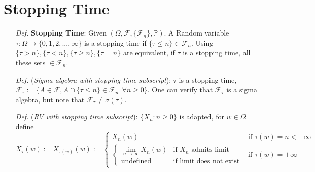 \documentclass[a4paper,12pt,twoside]{book}
\begin{document}
\section{Stopping Time}
\begin{itemize}
	\item[\textit{Def.}] \textbf{Stopping Time}: Given $(\Omega, \mathcal{F}, \{\mathcal{F}_n\}, \mathbb{P})$. A Random variable $\tau: \Omega \to \{0,1,2,..., \infty\}$ is a stopping time if $\{\tau\leq n\}\in \mathcal{F}_n$. Using $\{\tau>n\},\{\tau<n\},\{\tau\geq n\},\{\tau=n\}$ are equivalent, if $\tau$ is a stopping time, all these sets $\in \mathcal{F}_n$.

	\item[\textit{Def.}] (\textit{Sigma algebra with stopping time subscript}): $\tau$ is a stopping time, $\mathcal{F}_{\tau}:=\{A\in \mathcal{F}, A\cap \{\tau \leq n\}\in \mathcal{F}_n~~\forall n\geq 0\}$. One can verify that $\mathcal{F}_{\tau}$ is a sigma algebra, but note that $\mathcal{F}_{\tau}\ne \sigma(\tau)$.

	\item[\textit{Def.}] (\textit{RV with stopping time subscript}): $\{X_n: n\geq 0\}$ is adapted, for $w\in \Omega$ define
	\begin{equation*}
		X_{\tau}(w):=X_{\tau(w)}(w) := \begin{cases}
		X_n(w) &\text{if $\tau(w)=n< +\infty$}\\
		\begin{cases}
		\lim\limits_{n\rightarrow\infty}X_n(w) &\text{if $X_n$ admits limit}\\
		\text{undefined} &\text{if limit does not exist}
		\end{cases} &\text{if $\tau(w)=+\infty$}
		\end{cases}
	\end{equation*}
\end{itemize}

\end{document}
